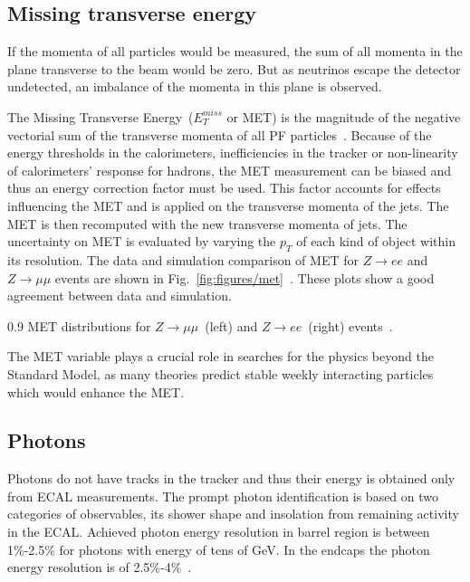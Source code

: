 \subsection{Missing transverse energy}


If the momenta of all particles would be measured, the sum of all momenta in the plane transverse to the beam would be zero. But as neutrinos escape the detector undetected, an imbalance of the momenta in this plane is observed. 

The Missing Transverse Energy~($E_{T}^{miss}$ or MET) is the magnitude of the negative vectorial sum of the transverse momenta of all PF particles~\cite{CMS:2016ljj}. Because of the energy thresholds in the calorimeters, inefficiencies in the tracker or non-linearity of calorimeters' response for hadrons, the MET measurement can be biased and thus an energy correction factor must be used. This factor accounts for effects influencing the MET and is applied on the transverse momenta of the jets. The MET is then recomputed with the new transverse momenta of jets. The uncertainty on MET is evaluated by varying the $p_{T}$ of each kind of object within its resolution. The data and simulation comparison of MET for  $Z \rightarrow ee$ and $Z \rightarrow \mu \mu$ events are shown in Fig.~\ref{fig:figures/met}~\cite{CMS:2016ljj}. These plots show a good agreement between data and simulation.


                 {0.9}       %
                 { MET distributions for $Z \rightarrow \mu \mu$~(left) and $Z \rightarrow ee$~(right) events~\cite{CMS:2016ljj}. }

The MET variable plays a crucial role in searches for the physics beyond the Standard Model, as many theories predict stable weekly interacting particles which would enhance the MET.


\subsection{Photons}

Photons do not have tracks in the tracker and thus their energy is obtained only from ECAL measurements. The prompt photon identification is based on two categories of observables, its shower shape and insolation from remaining activity in the ECAL. Achieved photon energy resolution in barrel region is between 1\%-2.5\% for photons with energy of tens of GeV. In the endcaps the photon energy resolution is of 2.5\%-4\%~\cite{CMS:EGM-14-001}.

